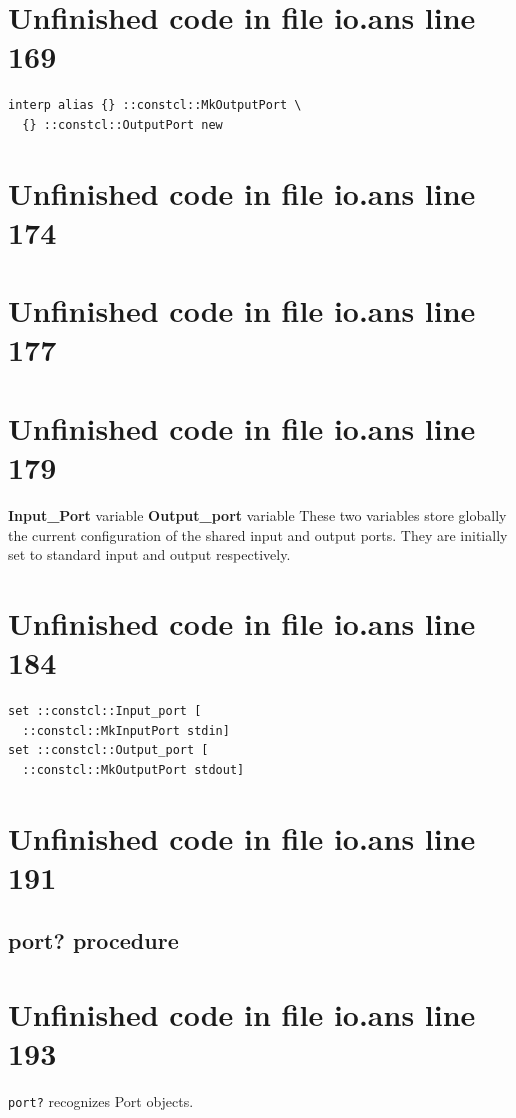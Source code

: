 \documentclass[twoside,9pt]{report}
\begin{document}
\section{Unfinished code in file io.ans line 169}
\begin{lstlisting}
interp alias {} ::constcl::MkOutputPort \
  {} ::constcl::OutputPort new
\end{lstlisting}
\section{Unfinished code in file io.ans line 174}

\section{Unfinished code in file io.ans line 177}
\section{Unfinished code in file io.ans line 179}

\textbf{Input\_Port} variable \textbf{Output\_port} variable These two variables store globally the current configuration of the shared input and output ports. They are initially set to standard input and output respectively.

\section{Unfinished code in file io.ans line 184}
\begin{lstlisting}
set ::constcl::Input_port [
  ::constcl::MkInputPort stdin]
set ::constcl::Output_port [
  ::constcl::MkOutputPort stdout]
\end{lstlisting}
\section{Unfinished code in file io.ans line 191}
\subsection{port? procedure}
\label{port?-procedure}
\section{Unfinished code in file io.ans line 193}


\texttt{port?} recognizes Port objects.
\end{document}
